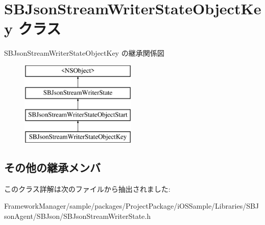\hypertarget{interface_s_b_json_stream_writer_state_object_key}{}\section{S\+B\+Json\+Stream\+Writer\+State\+Object\+Key クラス}
\label{interface_s_b_json_stream_writer_state_object_key}
S\+B\+Json\+Stream\+Writer\+State\+Object\+Key の継承関係図\begin{figure}[H]
\begin{center}
\leavevmode
\includegraphics[height=4.000000cm]{interface_s_b_json_stream_writer_state_object_key}
\end{center}
\end{figure}
\subsection*{その他の継承メンバ}


このクラス詳解は次のファイルから抽出されました\+:\begin{DoxyCompactItemize}
\item 
Framework\+Manager/sample/packages/\+Project\+Package/i\+O\+S\+Sample/\+Libraries/\+S\+B\+Json\+Agent/\+S\+B\+Json/S\+B\+Json\+Stream\+Writer\+State.\+h\end{DoxyCompactItemize}

